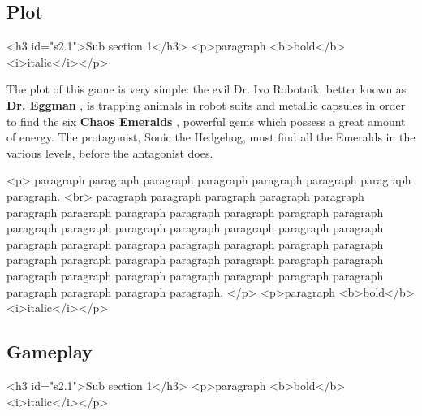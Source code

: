 \documentclass[a4paper,10pt]{book}
\begin{document}
 \subsection{Plot }
 <h3 id="s2.1">Sub section 1</h3>
        <p>paragraph <b>bold</b> <i>italic</i></p> 
 
          The plot of this game is very simple: the evil Dr. Ivo Robotnik, better known as  \textbf{Dr. Eggman } , is trapping animals in robot suits and metallic capsules in order to find the six  \textbf{Chaos Emeralds } , powerful gems which possess a great amount of energy. The protagonist, Sonic the Hedgehog, must find all the Emeralds in the various levels, before the antagonist does.
         
 <p>
          paragraph paragraph paragraph paragraph paragraph paragraph paragraph paragraph. <br>
          paragraph paragraph paragraph paragraph paragraph paragraph paragraph paragraph paragraph paragraph paragraph paragraph paragraph paragraph paragraph paragraph paragraph paragraph paragraph paragraph paragraph paragraph paragraph paragraph paragraph paragraph paragraph paragraph paragraph paragraph paragraph paragraph paragraph paragraph paragraph paragraph paragraph paragraph paragraph paragraph paragraph paragraph paragraph paragraph.
        </p>
        <p>paragraph <b>bold</b> <i>italic</i></p> 
 \subsection{Gameplay }
 <h3 id="s2.1">Sub section 1</h3>
        <p>paragraph <b>bold</b> <i>italic</i></p> 
 
\end{document}
